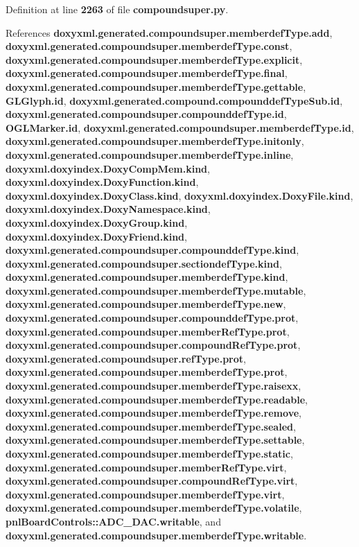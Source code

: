 Definition at line {\bf 2263} of file {\bf compoundsuper.\+py}.



References {\bf doxyxml.\+generated.\+compoundsuper.\+memberdef\+Type.\+add}, {\bf doxyxml.\+generated.\+compoundsuper.\+memberdef\+Type.\+const}, {\bf doxyxml.\+generated.\+compoundsuper.\+memberdef\+Type.\+explicit}, {\bf doxyxml.\+generated.\+compoundsuper.\+memberdef\+Type.\+final}, {\bf doxyxml.\+generated.\+compoundsuper.\+memberdef\+Type.\+gettable}, {\bf G\+L\+Glyph.\+id}, {\bf doxyxml.\+generated.\+compound.\+compounddef\+Type\+Sub.\+id}, {\bf doxyxml.\+generated.\+compoundsuper.\+compounddef\+Type.\+id}, {\bf O\+G\+L\+Marker.\+id}, {\bf doxyxml.\+generated.\+compoundsuper.\+memberdef\+Type.\+id}, {\bf doxyxml.\+generated.\+compoundsuper.\+memberdef\+Type.\+initonly}, {\bf doxyxml.\+generated.\+compoundsuper.\+memberdef\+Type.\+inline}, {\bf doxyxml.\+doxyindex.\+Doxy\+Comp\+Mem.\+kind}, {\bf doxyxml.\+doxyindex.\+Doxy\+Function.\+kind}, {\bf doxyxml.\+doxyindex.\+Doxy\+Class.\+kind}, {\bf doxyxml.\+doxyindex.\+Doxy\+File.\+kind}, {\bf doxyxml.\+doxyindex.\+Doxy\+Namespace.\+kind}, {\bf doxyxml.\+doxyindex.\+Doxy\+Group.\+kind}, {\bf doxyxml.\+doxyindex.\+Doxy\+Friend.\+kind}, {\bf doxyxml.\+generated.\+compoundsuper.\+compounddef\+Type.\+kind}, {\bf doxyxml.\+generated.\+compoundsuper.\+sectiondef\+Type.\+kind}, {\bf doxyxml.\+generated.\+compoundsuper.\+memberdef\+Type.\+kind}, {\bf doxyxml.\+generated.\+compoundsuper.\+memberdef\+Type.\+mutable}, {\bf doxyxml.\+generated.\+compoundsuper.\+memberdef\+Type.\+new}, {\bf doxyxml.\+generated.\+compoundsuper.\+compounddef\+Type.\+prot}, {\bf doxyxml.\+generated.\+compoundsuper.\+member\+Ref\+Type.\+prot}, {\bf doxyxml.\+generated.\+compoundsuper.\+compound\+Ref\+Type.\+prot}, {\bf doxyxml.\+generated.\+compoundsuper.\+ref\+Type.\+prot}, {\bf doxyxml.\+generated.\+compoundsuper.\+memberdef\+Type.\+prot}, {\bf doxyxml.\+generated.\+compoundsuper.\+memberdef\+Type.\+raisexx}, {\bf doxyxml.\+generated.\+compoundsuper.\+memberdef\+Type.\+readable}, {\bf doxyxml.\+generated.\+compoundsuper.\+memberdef\+Type.\+remove}, {\bf doxyxml.\+generated.\+compoundsuper.\+memberdef\+Type.\+sealed}, {\bf doxyxml.\+generated.\+compoundsuper.\+memberdef\+Type.\+settable}, {\bf doxyxml.\+generated.\+compoundsuper.\+memberdef\+Type.\+static}, {\bf doxyxml.\+generated.\+compoundsuper.\+member\+Ref\+Type.\+virt}, {\bf doxyxml.\+generated.\+compoundsuper.\+compound\+Ref\+Type.\+virt}, {\bf doxyxml.\+generated.\+compoundsuper.\+memberdef\+Type.\+virt}, {\bf doxyxml.\+generated.\+compoundsuper.\+memberdef\+Type.\+volatile}, {\bf pnl\+Board\+Controls\+::\+A\+D\+C\+\_\+\+D\+A\+C.\+writable}, and {\bf doxyxml.\+generated.\+compoundsuper.\+memberdef\+Type.\+writable}.



